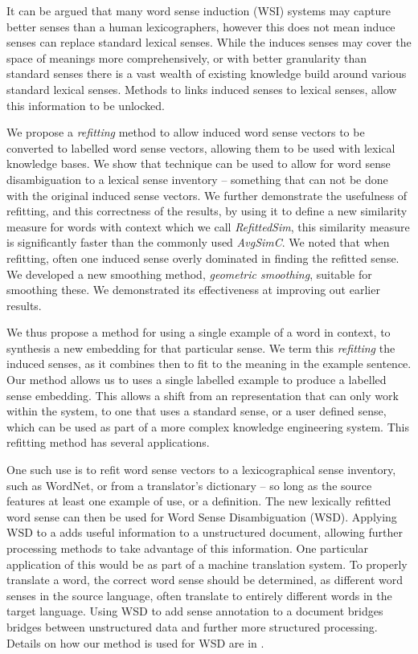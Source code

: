 \documentclass{sig-alternate}
\begin{document}
It can be argued that many word sense induction (WSI) systems may capture better senses than a human lexicographers, however this does not mean induce senses can replace standard lexical senses. While the induces senses may cover the space of meanings more comprehensively, or with better granularity than standard senses there is a vast wealth of existing knowledge build around various standard lexical senses. Methods to links induced senses to lexical senses, allow this information to be unlocked.



We propose a \emph{refitting} method to allow induced word sense vectors to be converted to labelled word sense vectors, allowing them to be used with lexical knowledge bases.
We show that technique can be used to allow for word sense disambiguation to a lexical sense inventory -- something that can not be done with the original induced sense vectors.
We further demonstrate the usefulness of refitting, and this correctness of the results, by using it to define a new similarity measure for words with context which we call \emph{RefittedSim}, this similarity measure is significantly faster than the commonly used \emph{AvgSimC}.
We noted that when refitting, often one induced sense overly dominated in finding the refitted sense. We developed a new smoothing method, \emph{geometric smoothing}, suitable for smoothing these. We demonstrated its effectiveness at improving out earlier results.

We thus propose a method for using a single example of a word in context, to synthesis a new embedding for that particular sense. We term this \emph{refitting} the induced senses, as it combines then to fit to the meaning in the example sentence. Our method allows us to uses a single labelled example to produce a labelled sense embedding. This allows a shift from an representation that can only work within the system, to one that uses a standard sense, or a user defined sense, which can be used as part of a more complex knowledge engineering system. This refitting method  has several applications.


One such use is to refit word sense vectors to a lexicographical sense inventory, such as WordNet, or from a translator's dictionary -- so long as the source features at least one example of use, or a definition. The new lexically refitted word sense can then be used for Word Sense Disambiguation (WSD). Applying WSD to a adds useful information to a unstructured document, allowing further processing methods to take advantage of this information. One particular application of this would be as part of a machine translation system. To properly translate a word, the correct word sense should be determined, as different word senses in the source language, often translate to entirely different words in the target language. Using WSD to add sense annotation to a document bridges bridges between unstructured data and further more structured processing.
Details on how our method is used for WSD are in .
\end{document}
